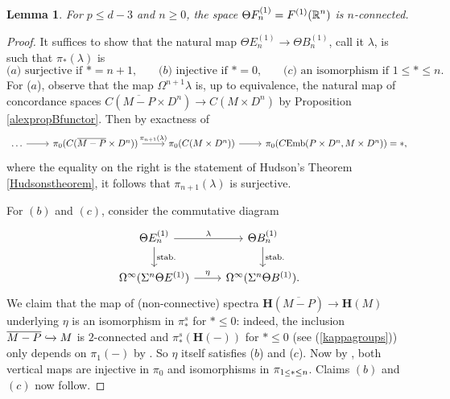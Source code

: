 \documentclass[a4paper, oneside]{amsart}
\newcommand{\cemb}{C\mathrm{Emb}}
\newcommand{\1}{\mathds{1}}
\newtheorem{lem}[thm]{Lemma}
\theoremstyle{remark}
\theoremstyle{definition}
\newcommand{\R}{{\scaleobj{0.97}{\mathbb{R}}}}
\newcommand{\leqs}{\scaleobj{0.85}{\leq}}
\newcommand{\Hsp}{\mathbf{H}}
\numberwithin{equation}{section}
\begin{document}
\begin{lem}\label{ThetaF1nconnectivity}
    For $p\leq d-3$ and $n\geq 0$, the space $\Theta F^{(1)}_n=F^{(1)}(\R^n)$ is $n$-connected.
\end{lem}
\begin{proof}
It suffices to show that the natural map $\Theta E^{(1)}_n\to \Theta B^{(1)}_n$, call it $\lambda$, is such that $\pi_*(\lambda)$ is
$$
\text{($a$) surjective if $*=n+1$,}\qquad \text{($b$) injective if $*=0$,} \qquad \text{($c$) an isomorphism if $1\leq *\leq n$.}
$$
For ($a$), observe that the map $\Omega^{n+1}\lambda$ is, up to equivalence, the natural map of concordance spaces $C(\overline{M-P}\times D^n)\to C(M\times D^n)$ by Proposition \ref{alexpropBfunctor}. Then by exactness of
$$
\begin{tikzcd}
    \dots\rar &\pi_0(C(\overline{M-P}\times D^n))\rar["\pi_{n+1}(\lambda)"] &\pi_0(C(M\times D^n))\rar & \pi_0(\cemb(P\times D^n, M\times D^n))=*,
\end{tikzcd}
$$
where the equality on the right is the statement of Hudson's Theorem \ref{Hudsonstheorem}, it follows that $\pi_{n+1}(\lambda)$ is surjective.

    For $(b)$ and $(c)$, consider the commutative diagram
    $$
\begin{tikzcd}
    \Theta E^{(1)}_n\rar["\lambda"]\dar["\mathrm{stab.}"]&\Theta B^{(1)}_n\dar["\mathrm{stab.}"]\\
   \Omega^{\infty}(\Sigma^n\Theta E^{(1)})\rar["\eta"] &\Omega^{\infty}(\Sigma^n\Theta B^{(1)}).
\end{tikzcd}
    $$
 We claim that the map of (non-connective) spectra $\Hsp(\overline{M-P})\to \Hsp(M)$ underlying $\eta$ is an isomorphism in $\pi_*^s$ for $*\leq 0$: indeed, the inclusion $\overline{M-P}\xhookrightarrow{}M$ is $2$-connected and $\pi_{*}^s(\Hsp(-))$ for $*\leq 0$ (see (\ref{kappagroups})) only depends on $\pi_1(-)$ by \cite[Cor. 5.6]{WWI}. So $\eta$ itself satisfies ($b$) and ($c$). Now by \cite[Cor. 5.8]{WWI}, both vertical maps are injective in $\pi_0$ and isomorphisms in $\pi_{1\leqs*\leq n}$. Claims $(b)$ and $(c)$ now follow.
\end{proof}
\end{document}
